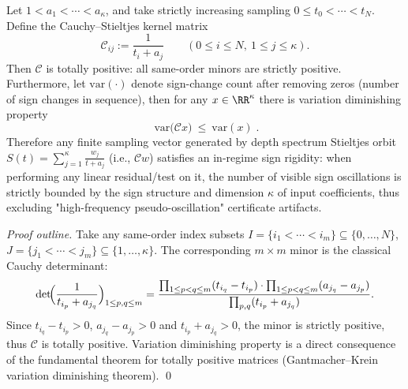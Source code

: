 \begin{proposition}\label{prop:xi-cauchy-stieltjes-total-positivity-variation-diminishing}
Let \(1<a_1<\cdots<a_\kappa\), and take strictly increasing sampling \(0\le t_0<\cdots<t_N\).
Define the Cauchy--Stieltjes kernel matrix
\[
\mathcal{C}_{ij}:=\frac{1}{t_i+a_j}\qquad(0\le i\le N,\ 1\le j\le\kappa).
\]
Then \(\mathcal{C}\) is totally positive: all same-order minors are strictly positive.
Furthermore, let \(\mathrm{var}(\cdot)\) denote sign-change count after removing zeros (number of sign changes in sequence), then for any \(x\in\RR^\kappa\) there is variation diminishing property
\[
\boxed{\;
\mathrm{var}\!\bigl(\mathcal{C}x\bigr)\ \le\ \mathrm{var}(x)\; }.
\]
Therefore any finite sampling vector generated by depth spectrum Stieltjes orbit
\(
S(t)=\sum_{j=1}^\kappa \frac{w_j}{t+a_j}
\)
(i.e., \(\mathcal{C}w\)) satisfies an in-regime sign rigidity: when performing any linear residual/test on it, the number of visible sign oscillations is strictly bounded by the sign structure and dimension \(\kappa\) of input coefficients, thus excluding "high-frequency pseudo-oscillation" certificate artifacts.
\end{proposition}
\begin{proof}[Proof outline]
Take any same-order index subsets \(I=\{i_1<\cdots<i_m\}\subseteq\{0,\dots,N\}\), \(J=\{j_1<\cdots<j_m\}\subseteq\{1,\dots,\kappa\}\).
The corresponding \(m\times m\) minor is the classical Cauchy determinant:
\[
\det\!\Bigl(\frac{1}{t_{i_p}+a_{j_q}}\Bigr)_{1\le p,q\le m}
=
\frac{\prod_{1\le p<q\le m}(t_{i_q}-t_{i_p})\cdot\prod_{1\le p<q\le m}(a_{j_q}-a_{j_p})}
{\prod_{p,q}(t_{i_p}+a_{j_q})}.
\]
Since \(t_{i_q}-t_{i_p}>0\), \(a_{j_q}-a_{j_p}>0\) and \(t_{i_p}+a_{j_q}>0\), the minor is strictly positive, thus \(\mathcal{C}\) is totally positive.
Variation diminishing property is a direct consequence of the fundamental theorem for totally positive matrices (Gantmacher--Krein variation diminishing theorem). \qed
\end{proof}

\endinput
